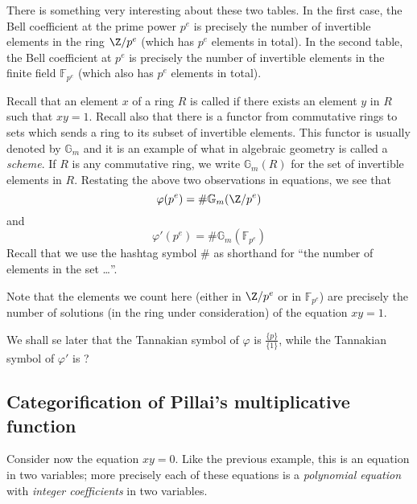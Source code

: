 \documentclass[a4paper]{article}
\begin{document}
There is something very interesting about these two tables. In the first case, the Bell coefficient at the prime power $p^e$ is precisely the number of invertible elements in the ring $\Z / p^e$ (which has $p^e$ elements in total). In the second table, the Bell coefficient at $p^e$ is precisely the number of invertible elements in the finite field $\mathbb{F}_{p^e}$ (which also has $p^e$ elements in total). 

Recall that an element $x$ of a ring $R$ is called  if there exists an element $y$ in $R$ such that $xy = 1$. Recall also that there is a functor from commutative rings to sets which sends a ring to its subset of invertible elements. This functor is usually denoted by $\mathbb{G}_m$ and it is an example of what in algebraic geometry is called a \emph{scheme}. If $R$ is any commutative ring, we write $\mathbb{G}_m(R)$ for the set of invertible elements in $R$. Restating the above two observations in equations, we see that
$$  \varphi(p^e) = \# \mathbb{G}_m(\Z / p^e)  $$
and 
$$  \varphi'(p^e) = \# \mathbb{G}_m(\mathbb{F}_{p^e})  $$
Recall that we use the hashtag symbol $\#$ as shorthand for ``the number of elements in the set \ldots''.

Note that the elements we count here (either in $\Z / p^e$ or in $\mathbb{F}_{p^e}$) are precisely the number of solutions (in the ring under consideration) of the equation $xy = 1$.


\begin{remark}
We shall se later that the Tannakian symbol of $\varphi$ is $\frac{ \{ p \} }{ \{ 1 \}  }$, while the Tannakian symbol of $\varphi'$ is ?
\end{remark}


\subsection{Categorification of Pillai's multiplicative function}

Consider now the equation $xy = 0$. Like the previous example, this is an equation in two variables; more precisely each of these equations is a \emph{polynomial equation} with \emph{integer coefficients} in two variables.
\end{document}
